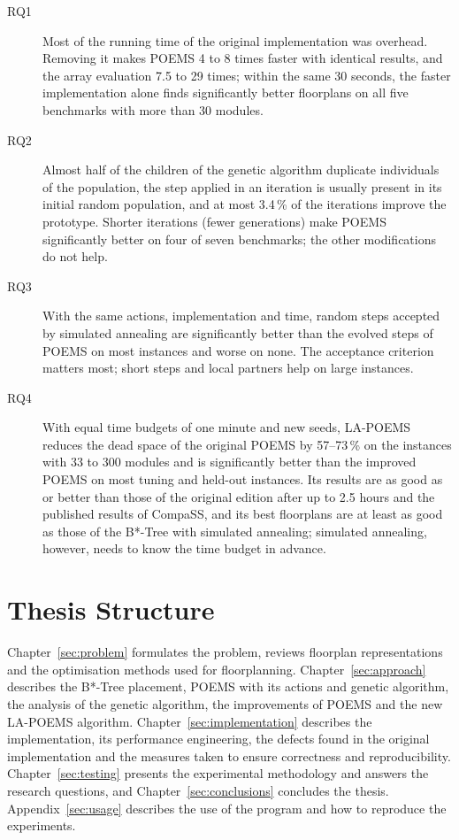 \begin{description}
\item[RQ1] Most of the running time of the original implementation was overhead. Removing it makes POEMS 4 to 8 times faster with identical results, and the array evaluation 7.5 to 29 times; within the same 30 seconds, the faster implementation alone finds significantly better floorplans on all five benchmarks with more than 30 modules.
\item[RQ2] Almost half of the children of the genetic algorithm duplicate individuals of the population, the step applied in an iteration is usually present in its initial random population, and at most 3.4\,\% of the iterations improve the prototype. Shorter iterations (fewer generations) make POEMS significantly better on four of seven benchmarks; the other modifications do not help.
\item[RQ3] With the same actions, implementation and time, random steps accepted by simulated annealing are significantly better than the evolved steps of POEMS on most instances and worse on none. The acceptance criterion matters most; short steps and local partners help on large instances.
\item[RQ4] With equal time budgets of one minute and new seeds, LA-POEMS reduces the dead space of the original POEMS by 57--73\,\% on the instances with 33 to 300 modules and is significantly better than the improved POEMS on most tuning and held-out instances. Its results are as good as or better than those of the original edition after up to 2.5 hours and the published results of CompaSS, and its best floorplans are at least as good as those of the B*-Tree with simulated annealing; simulated annealing, however, needs to know the time budget in advance.
\end{description}

\section{Thesis Structure}

Chapter~\ref{sec:problem} formulates the problem, reviews floorplan representations and the optimisation methods used for floorplanning. Chapter~\ref{sec:approach} describes the B*-Tree placement, POEMS with its actions and genetic algorithm, the analysis of the genetic algorithm, the improvements of POEMS and the new LA-POEMS algorithm. Chapter~\ref{sec:implementation} describes the implementation, its performance engineering, the defects found in the original implementation and the measures taken to ensure correctness and reproducibility. Chapter~\ref{sec:testing} presents the experimental methodology and answers the research questions, and Chapter~\ref{sec:conclusions} concludes the thesis. Appendix~\ref{sec:usage} describes the use of the program and how to reproduce the experiments.

